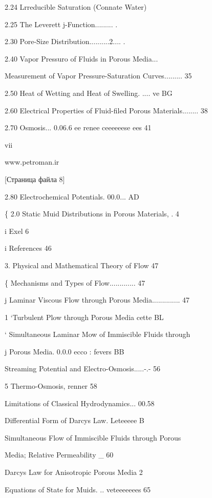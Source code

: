 \documentclass[
  11pt,
]{article}
\begin{document}
2.24 Lrreducible Saturation (Connate Water)\par
2.25 The Leverett j-Function......... .\par
2.30 Pore-Size Distribution..........2.... .\par
2.40 Vapor Pressuro of Fluids in Porous Media...\par
{} Measurement of Vapor Pressure-Saturation Curves......... 35\par
2.50 Heat of Wetting and Heat of Swelling. .... ve BG\par
2.60 Electrical Properties of Fluid-filed Porous Materials........ 38\par
2.70 Osmosis... 0.06.6 ee renee ceeeeeese ees 41\par
\smallskip
vii\par
\smallskip
www.petroman.ir\par
\smallskip
\smallskip
{[}Страница файла 8{]}\par
2.80 Electrochemical Potentials. 00.0... AD\par
\{ 2.0 Static Muid Distributions in Porous Materials, . 4\par
i Exel 6\par
i References 46\par
\textbar{} 3. Physical and Mathematical Theory of Flow 47\par
\{ Mechanisms and Types of Flow............. 47\par
j Laminar Viscous Flow through Porous Media.............. 47\par
1 `Turbulent Plow through Porous Media cette BL\par
` Simultaneous Laminar Mow of Immiscible Fluids through\par
j Porous Media. 0.0.0 ecco : fevers BB\par
Streaming Potential and Electro-Osmosis.....-.- 56\par
5 Thermo-Osmosis, renner 58\par
Limitations of Classical Hydrodynamics... 00.58\par
Differential Form of Darcy\textquotesingle s Law. Leteeeee B\par
Simultaneous Flow of Immiscible Fluids through Porous\par
Media; Relative Permeability \_ 60\par
Darcy\textquotesingle s Law for Anisotropic Porous Media 2\par
Equations of State for Muids. .. veteeeeeees 65\par
\end{document}
